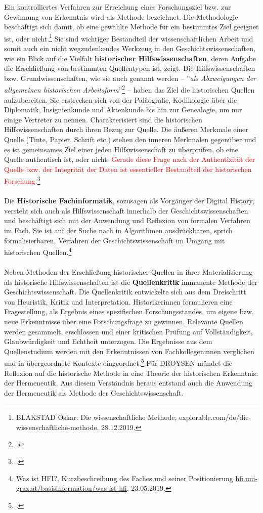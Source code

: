 \documentclass[12pt,a4paper]{article}
\begin{document}
Ein kontrolliertes Verfahren zur Erreichung eines Forschungsziel bzw. zur Gewinnung von Erkenntnis wird als Methode bezeichnet. Die Methodologie beschäftigt sich damit, ob eine gewählte Methode für ein bestimmtes Ziel geeignet ist, oder nicht.\footnote{BLAKSTAD Oskar: Die wissenschaftliche Methode, explorable.com/de/die-wissenschaftliche-methode, 28.12.2019.} Sie sind wichtiger Bestandteil der wissenschaftlichen Arbeit und somit auch ein nicht wegzudenkendes Werkzeug in den Geschichtswissenschaften, wie ein Blick auf die Vielfalt \textbf{historischer Hilfswissenschaften}, deren Aufgabe die Erschließung von bestimmten Quellentypen ist, zeigt. Die Hilfswissenschaften bzw. Grundwissenschaften, wie sie auch genannt werden -- ''\textit{als Abzweigungen der allgemeinen historischen Arbeitsform}''\footcite[][S.10]{von2007werkzeug} -- haben das Ziel die historischen Quellen aufzubereiten. Sie erstrecken sich von der Paläografie, Kodikologie über die Diplomatik, Insignienkunde und Aktenkunde bis hin zur Genealogie, um nur einige Vertreter zu nennen. Charakterisiert sind die historischen Hilfswissenschaften durch ihren Bezug zur Quelle. Die äußeren Merkmale einer Quelle (Tinte, Papier, Schrift etc.) stehen den inneren Merkmalen gegenüber und es ist gemeinsames Ziel einer jeden Hilfswissenschaft zu überprüfen, ob eine Quelle authentisch ist, oder nicht. \textcolor{red}{ Gerade diese Frage nach der Authentizität der Quelle bzw. der Integrität der Daten ist essentieller Bestandteil der historischen Forschung.}\footcite[][S.7]{fickers2020update}
\\
\\
Die \textbf{Historische Fachinformatik}, sozusagen als Vorgänger der Digital History, versteht sich auch als Hilfswissenschaft innerhalb der Geschichtswissenschaften und beschäftigt sich mit der Anwendung und Reflexion von formalen Verfahren im Fach. Sie ist auf der Suche nach in Algorithmen ausdrückbaren, sprich formalisierbaren, Verfahren der Geschichtswissenschaft im Umgang mit historischen Quellen.\footnote{Was ist HFI?, Kurzbeschreibung des Faches und seiner Positionierung \protect\url{hfi.uni-graz.at/basisinformation/was-ist-hfi}, 23.05.2019.} 
\\
\\
Neben Methoden der Erschließung historischer Quellen in ihrer Materialisierung als historische Hilfswissenschaften ist die \textbf{Quellenkritik} immanente Methode der Geschichtswissenschaft. Die Quellenkritik entwickelte sich aus dem Dreischritt von Heuristik, Kritik und Interpretation. Historikerinnen formulieren eine Fragestellung, als Ergebnis eines spezifischen Forschungsstandes, um eigene bzw. neue Erkenntnisse über eine Forschungsfrage zu gewinnen. Relevante Quellen werden gesammelt, erschlossen und einer kritischen Prüfung auf Vollständigkeit, Glaubwürdigkeit und Echtheit unterzogen. Die Ergebnisse aus dem Quellenstudium werden mit den Erkenntnissen von Fachkollegeninnen verglichen und in übergeordnete Kontexte eingeordnet.\footcite[][S.43-45]{jordan2018theorien} Für DROYSEN mündet die Reflexion auf die historische Methode in eine Theorie der historischen Erkenntnis: der Hermeneutik. Aus diesem Verständnis heraus entstand auch die Anwendung der Hermeneutik als Methode der Geschichtswissenschaft.
\end{document}
